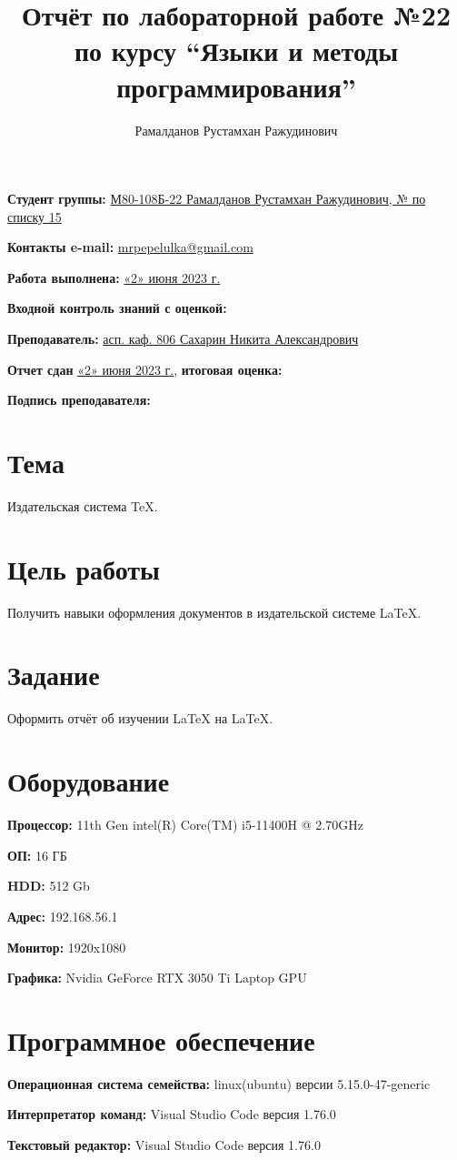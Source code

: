 \documentclass[12pt, letterpaper]{article}
\title{Отчёт по лабораторной работе №22 по курсу “Языки и методы программирования”}
\author{Рамалданов Рустамхан Ражудинович}
\begin{document}
\maketitle
\begin{description}
\item\textbf{Студент группы:} \underline{М80-108Б-22 Рамалданов Рустамхан Ражудинович, № по списку 15}
\item\textbf{Контакты e-mail:} \underline{mrpepelulka@gmail.com}
\item\textbf{Работа выполнена:} \underline{«2» июня 2023 г.}
\item\textbf{Входной контроль знаний с оценкой:}
\item\textbf{Преподаватель:} \underline{асп. каф. 806 Сахарин Никита Александрович}
\item\textbf{Отчет сдан} \underline{«2» июня 2023 г.}, \textbf{итоговая оценка:}
\item\textbf{Подпись преподавателя:} \underline{\hspace{3cm}}
\end{description}
\newpage
\section{Тема}
Издательская система \TeX{}.
\section{Цель работы}
Получить навыки оформления документов в издательской системе \LaTeX{}.
\section{Задание}
Оформить отчёт об изучении \LaTeX{} на \LaTeX{}.
\section{Оборудование}
\begin{description}
\item\textbf{Процессор:} 11th Gen intel(R) Core(TM) i5-11400H @ 2.70GHz
\item\textbf{ОП:} 16 ГБ
\item\textbf{HDD:} 512 Gb
\item\textbf{Адрес:} 192.168.56.1
\item\textbf{Монитор:} 1920x1080
\item\textbf{Графика:} Nvidia GeForce RTX 3050 Ti Laptop GPU
\end{description}
\section{Программное обеспечение}
\begin{description}
\item\textbf{Операционная система семейства:} linux(ubuntu) версии 5.15.0-47-generic
\item\textbf{Интерпретатор команд:} Visual Studio Code версия 1.76.0
\item\textbf{Текстовый редактор:} Visual Studio Code версия 1.76.0
\end{description}
\end{document}
